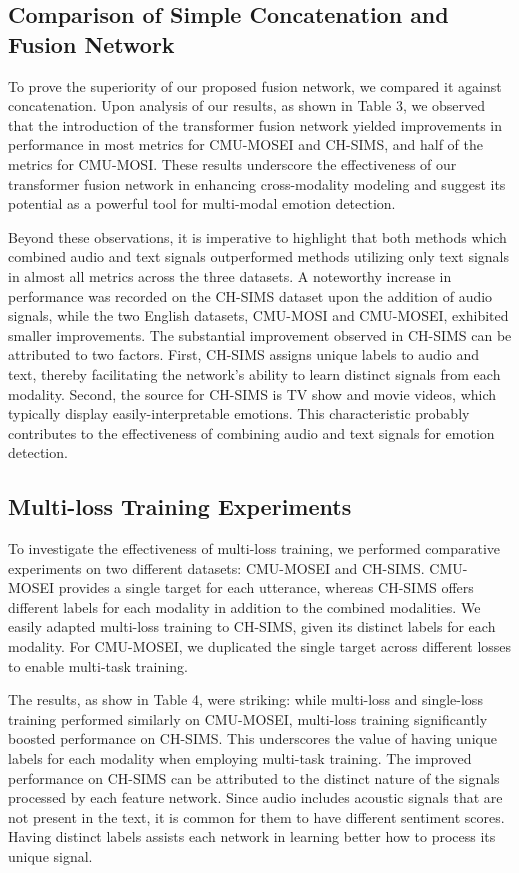\documentclass[11pt]{article}
\begin{document}
\subsection{Comparison of Simple Concatenation and Fusion Network}
To prove the superiority of our proposed fusion network, we compared it against concatenation. Upon analysis of our results, as shown in Table 3, we observed that the introduction of the transformer fusion network yielded improvements in performance in most metrics for CMU-MOSEI and CH-SIMS, and half of the metrics for CMU-MOSI. These results underscore the effectiveness of our transformer fusion network in enhancing cross-modality modeling and suggest its potential as a powerful tool for multi-modal emotion detection.

Beyond these observations, it is imperative to highlight that both methods which combined audio and text signals outperformed methods utilizing only text signals in almost all metrics across the three datasets. A noteworthy increase in performance was recorded on the CH-SIMS dataset upon the addition of audio signals, while the two English datasets, CMU-MOSI and CMU-MOSEI, exhibited smaller improvements. The substantial improvement observed in CH-SIMS can be attributed to two factors. First, CH-SIMS assigns unique labels to audio and text, thereby facilitating the network's ability to learn distinct signals from each modality. Second, the source for CH-SIMS  is TV show and movie videos, which typically display easily-interpretable emotions. This characteristic probably contributes to the effectiveness of combining audio and text signals for emotion detection.


\subsection{Multi-loss Training Experiments}
To investigate the effectiveness of multi-loss training, we performed comparative experiments on two different datasets: CMU-MOSEI and CH-SIMS. CMU-MOSEI provides a single target for each utterance, whereas CH-SIMS offers different labels for each modality in addition to the combined modalities.
We easily adapted multi-loss training to CH-SIMS, given its distinct labels for each modality. For CMU-MOSEI, we duplicated the single target across different losses to enable multi-task training. 

The results, as show in Table 4, were striking: while multi-loss and single-loss training performed similarly on CMU-MOSEI, multi-loss training significantly boosted performance on CH-SIMS. This underscores the value of having unique labels for each modality when employing multi-task training. The improved performance on CH-SIMS can be attributed to the distinct nature of the signals processed by each feature network. Since audio includes acoustic signals that are not present in the text, it is common for them to have different sentiment scores. Having distinct labels assists each network in learning better how to process its unique signal.
\end{document}
